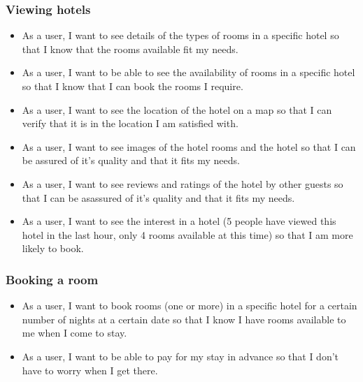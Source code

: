 \documentclass[english,a4paper,12pt,twoside]{article}
\begin{document}
\subsubsection*{Viewing hotels}
\begin{itemize}
  \item As a user, I want to see details of the types of rooms in a specific hotel so that I know that the rooms available fit my needs.
  \item As a user, I want to be able to see the availability of rooms in a specific hotel so that I know that I can book the rooms I require.
  \item As a user, I want to see the location of the hotel on a map so that I can verify that it is in the location I am satisfied with.
  \item As a user, I want to see images of the hotel rooms and the hotel so that I can be assured of it's quality and that it fits my needs.
  \item As a user, I want to see reviews and ratings of the hotel by other guests so that I can be asassured of it's quality and that it fits my needs.
  \item As a user, I want to see the interest in a hotel (5 people have viewed this hotel in the last hour, only 4 rooms available at this time) so that I am more likely to book.
\end{itemize}

\subsubsection*{Booking a room}
\begin{itemize}
  \item As a user, I want to book rooms (one or more) in a specific hotel for a certain number of nights at a certain date so that I know I have rooms available to me when I come to stay.
  \item As a user, I want to be able to pay for my stay in advance so that I don't have to worry when I get there.
\end{itemize}
\end{document}
